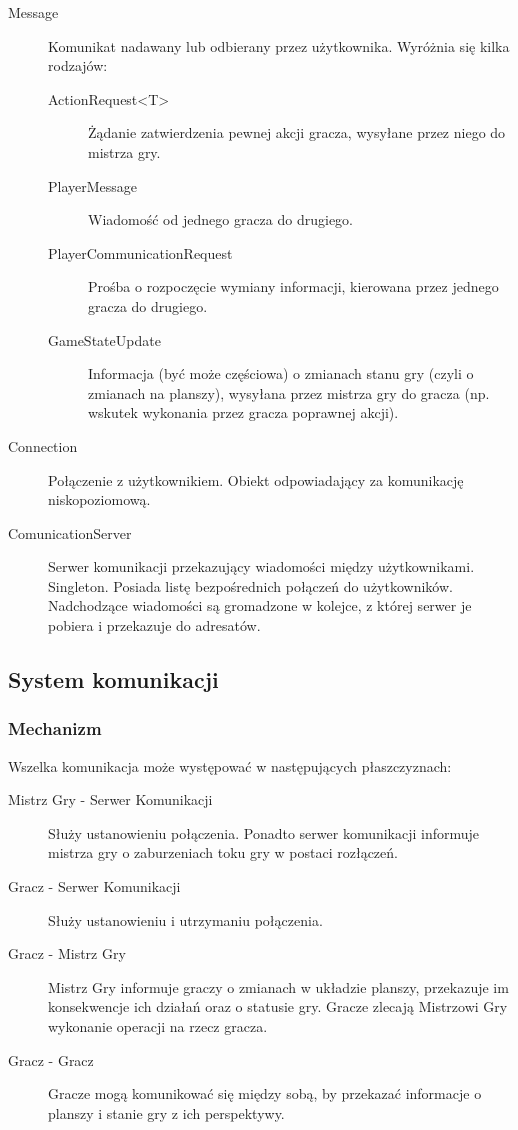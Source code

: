 \documentclass[11pt]{article}
\let\Oldsubsection\subsection
\renewcommand{\subsection}{\FloatBarrier\Oldsubsection}
\let\Oldsubsubsection\subsubsection
\renewcommand{\subsubsection}{\FloatBarrier\Oldsubsubsection}
\begin{document}
\begin{description}
	\item[Message] Komunikat nadawany lub odbierany przez użytkownika. Wyróżnia się kilka rodzajów:
		\begin{description}
			\item[ActionRequest<T>] Żądanie zatwierdzenia pewnej akcji gracza, wysyłane przez niego do mistrza gry.
			\item[PlayerMessage] Wiadomość od jednego gracza do drugiego.
			\item[PlayerCommunicationRequest] Prośba o rozpoczęcie wymiany informacji, kierowana przez jednego gracza do drugiego.
			\item[GameStateUpdate] Informacja (być może częściowa) o zmianach stanu gry (czyli o zmianach na planszy), wysyłana przez mistrza gry do gracza (np. wskutek wykonania przez gracza poprawnej akcji).
		\end{description}

	\item[Connection] Połączenie z użytkownikiem. Obiekt odpowiadający za komunikację niskopoziomową.

	\item[ComunicationServer] Serwer komunikacji przekazujący wiadomości między użytkownikami. Singleton. Posiada listę bezpośrednich połączeń do użytkowników. Nadchodzące wiadomości są gromadzone w kolejce, z której serwer je pobiera i przekazuje do adresatów.
\end{description}

\subsection{System komunikacji}

\subsubsection{Mechanizm}
\par
Wszelka komunikacja może występować w następujących płaszczyznach:
\begin{description}
\item[Mistrz Gry - Serwer Komunikacji] Służy ustanowieniu połączenia. Ponadto serwer komunikacji informuje mistrza gry o zaburzeniach toku gry w postaci rozłączeń.
\item[Gracz - Serwer Komunikacji] Służy ustanowieniu i utrzymaniu połączenia.
\item[Gracz - Mistrz Gry] Mistrz Gry informuje graczy o zmianach w układzie planszy, przekazuje im konsekwencje ich działań oraz o statusie gry. Gracze zlecają Mistrzowi Gry wykonanie operacji na rzecz gracza.
\item[Gracz - Gracz] Gracze mogą komunikować się między sobą, by przekazać informacje o planszy i stanie gry z ich perspektywy.
\end{description}
\end{document}
